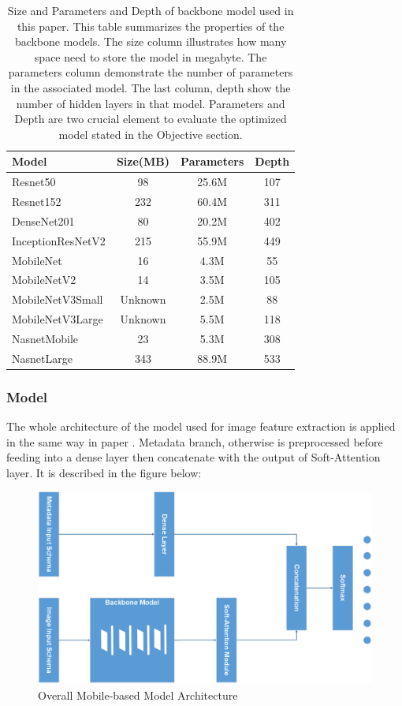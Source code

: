 \documentclass[sensors,article,submit,pdftex,moreauthors]{Definitions/mdpi}
\begin{document}
\begin{table}[H]
	\centering
	\begin{tabular}{|l | c c c|} 
		\hline
		Model & Size(MB) & Parameters & Depth \\ 
		\hline
		Resnet50 & 98 & 25.6M & 107 \\ 
		\hline
		Resnet152 & 232 & 60.4M & 311 \\ 
		\hline
		DenseNet201 & 80 & 20.2M & 402 \\
		\hline
		InceptionResNetV2\cite{07261} & 215 & 55.9M & 449 \\
		\hline
		MobileNet & 16 & 4.3M & 55 \\ 
		\hline
		MobileNetV2 & 14 & 3.5M & 105 \\ 
		\hline
		MobileNetV3Small & Unknown & 2.5M & 88 \\ 
		\hline
		MobileNetV3Large & Unknown & 5.5M & 118 \\
		\hline
		NasnetMobile & 23 & 5.3M & 308 \\
		\hline
		NasnetLarge & 343 & 88.9M & 533 \\ 
		\hline
	\end{tabular}
	\caption{Size and Parameters and Depth of backbone model used in this paper. This table summarizes the properties of the backbone models. The size column illustrates how many space need to store the model in megabyte. The parameters column demonstrate the number of parameters in the associated model. The last column, depth show the number of hidden layers in that model. Parameters and Depth are two crucial element to evaluate the optimized model stated in the Objective section.}
	\label{table:model-summary}
\end{table}

\subsubsection{Model}
The whole architecture of the model used for image feature extraction is applied in the same way in paper \cite{03358}. Metadata branch, otherwise is preprocessed before feeding into a dense layer then concatenate with the output of Soft-Attention layer. It is described in the figure below:

\begin{figure}[H]
	\centering
	\includegraphics[width=0.5\linewidth]{Definitions/MainModel - Model Form}
	\caption{Overall Mobile-based Model Architecture}
	\label{fig:main-model}
\end{figure}
\end{document}
